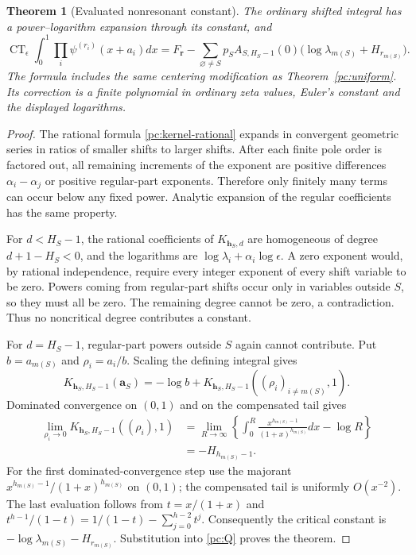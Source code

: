 \documentclass[11pt,a4paper]{article}
\newtheorem{theorem}{Theorem}[section]
\theoremstyle{definition}
\theoremstyle{remark}
\numberwithin{equation}{section}
\begin{document}
\begin{theorem}[Evaluated nonresonant constant]\label{pc:nonresonant}
The ordinary shifted integral has a power--logarithm expansion through
its constant, and
\begin{equation}\label{pc:nonresonant-constant}
 \boxed{\displaystyle
 \operatorname{CT}_{\epsilon}
      \int_0^1\prod_i\psi^{(r_i)}(x+a_i)dx
  =F_{\boldsymbol r}
    -\sum_{\varnothing\ne S}p_S A_{S,H_S-1}(0)
            \bigl(\log\lambda_{m(S)}+H_{r_{m(S)}}\bigr).}
\end{equation}
The formula includes the same centering modification as
Theorem~\ref{pc:uniform}.  Its correction is a finite polynomial in
ordinary zeta values, Euler's constant and the displayed logarithms.
\end{theorem}

\begin{proof}
The rational formula \eqref{pc:kernel-rational} expands in convergent
geometric series in ratios of smaller shifts to larger shifts.
After each finite pole order is factored out, all remaining increments
of the exponent are positive differences $\alpha_i-\alpha_j$ or
positive regular-part exponents.  Therefore only finitely many terms
can occur below any fixed power.  Analytic expansion of the regular
coefficients has the same property.

For $d<H_S-1$, the rational coefficients of $K_{\boldsymbol h_S,d}$
are homogeneous of degree $d+1-H_S<0$, and the logarithms are
$\log\lambda_i+\alpha_i\log\epsilon$.  A zero exponent would,
by rational independence, require every integer exponent of every
shift variable to be zero.  Powers coming from regular-part shifts
occur only in variables outside $S$, so they must all be zero.
The remaining degree cannot be zero, a contradiction.  Thus no
noncritical degree contributes a constant.

For $d=H_S-1$, regular-part powers outside $S$ again cannot contribute.
Put $b=a_{m(S)}$ and $\rho_i=a_i/b$.  Scaling the defining integral
gives
\[
 K_{\boldsymbol h_S,H_S-1}(\boldsymbol a_S)
     =-\log b+
          K_{\boldsymbol h_S,H_S-1}
                         ((\rho_i)_{i\ne m(S)},1).
\]
Dominated convergence on $(0,1)$ and on the compensated tail gives
\begin{align*}
 \lim_{\rho_i\to0}
 K_{\boldsymbol h_S,H_S-1}((\rho_i),1)
 &=\lim_{R\to\infty}\left\{
   \int_0^R\frac{x^{h_{m(S)}-1}}{(1+x)^{h_{m(S)}}}dx-\log R
                                        \right\}\\
 &=-H_{h_{m(S)}-1}.
\end{align*}
For the first dominated-convergence step use the majorant
$x^{h_{m(S)}-1}/(1+x)^{h_{m(S)}}$ on $(0,1)$; the compensated
tail is uniformly $O(x^{-2})$.  The last evaluation follows from
$t=x/(1+x)$ and
$t^{h-1}/(1-t)=1/(1-t)-\sum_{j=0}^{h-2}t^j$.
Consequently the critical constant is
$-\log\lambda_{m(S)}-H_{r_{m(S)}}$.  Substitution into
\eqref{pc:Q} proves the theorem.
\end{proof}
\end{document}
